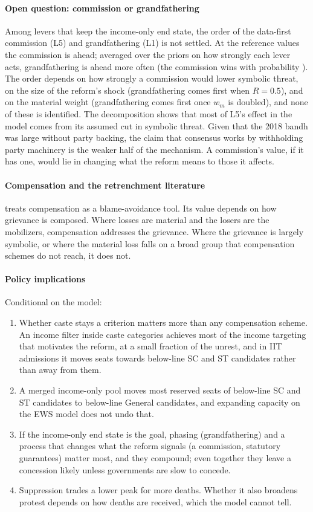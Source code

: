 \documentclass[11pt,a4paper]{article}
\begin{document}
\paragraph{Open question: commission or grandfathering} Among levers that keep the income-only end state, the order of the data-first commission (L5) and grandfathering (L1) is not settled. At the reference values the commission is ahead; averaged over the priors on how strongly each lever acts, grandfathering is ahead more often (the commission wins with probability \MapGroundedLFiveBeatsLOne). The order depends on how strongly a commission would lower symbolic threat, on the size of the reform's shock (grandfathering comes first when $R=0.5$), and on the material weight (grandfathering comes first once $w_m$ is doubled), and none of these is identified. The decomposition shows that most of L5's effect in the model comes from its assumed cut in symbolic threat. Given that the 2018 bandh was large without party backing, the claim that consensus works by withholding party machinery is the weaker half of the mechanism. A commission's value, if it has one, would lie in changing what the reform means to those it affects.

\paragraph{Compensation and the retrenchment literature} \citet{pierson1994} treats compensation as a blame-avoidance tool. Its value depends on how grievance is composed. Where losses are material and the losers are the mobilizers, compensation addresses the grievance. Where the grievance is largely symbolic, or where the material loss falls on a broad group that compensation schemes do not reach, it does not.

\paragraph{Policy implications} Conditional on the model:
\begin{enumerate}
\item Whether caste stays a criterion matters more than any compensation scheme. An income filter inside caste categories achieves most of the income targeting that motivates the reform, at a small fraction of the unrest, and in IIT admissions it moves seats towards below-line SC and ST candidates rather than away from them.
\item A merged income-only pool moves most reserved seats of below-line SC and ST candidates to below-line General candidates, and expanding capacity on the EWS model does not undo that.
\item If the income-only end state is the goal, phasing (grandfathering) and a process that changes what the reform signals (a commission, statutory guarantees) matter most, and they compound; even together they leave a concession likely unless governments are slow to concede.
\item Suppression trades a lower peak for more deaths. Whether it also broadens protest depends on how deaths are received, which the model cannot tell.
\end{enumerate}
\end{document}
